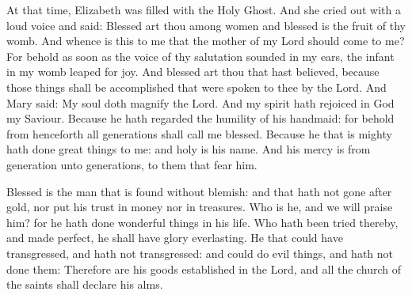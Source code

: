 
At that time, Elizabeth was filled with the
Holy Ghost.
And she cried out with a loud voice and said: Blessed art thou
among women and blessed is the fruit of thy womb.
And whence is this to me that the mother of my Lord should come to
me?
For behold as soon as the voice of thy salutation sounded in my
ears, the infant in my womb leaped for joy.
And blessed art thou that hast believed, because those things
shall be accomplished that were spoken to thee by the Lord.
And Mary said: My soul doth magnify the Lord.
And my spirit hath rejoiced in God my Saviour.
Because he hath regarded the humility of his handmaid: for behold
from henceforth all generations shall call me blessed.
Because he that is mighty hath done great things to me: and holy
is his name.
And his mercy is from generation unto generations, to them that
fear him.

\bigskip




Blessed is the man that is found without blemish: and that
hath not gone after gold, nor put his trust in money nor in treasures.
Who is he, and we will praise him? for he hath done wonderful
things in his life.
Who hath been tried thereby, and made perfect, he shall have
glory everlasting. He that could have transgressed, and hath not
transgressed: and could do evil things, and hath not done them:
Therefore are his goods established in the Lord, and all the
church of the saints shall declare his alms.


\label{Go.joachim}

